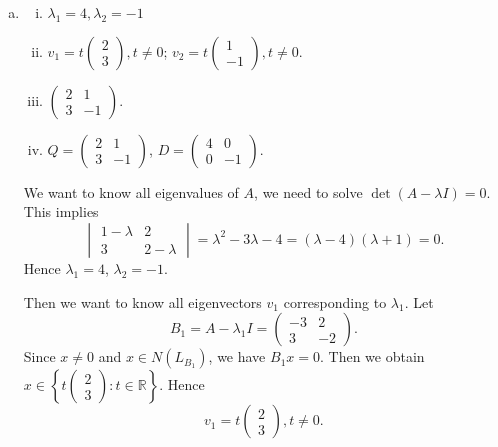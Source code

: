 \begin{Exercise}
\begin{enumerate}[(a)]
\item
\begin{answer}
\begin{enumerate}[(i)]
\item $\lambda_1 = 4, \lambda_2 = -1$

\item $v_1 = t\begin{pmatrix}
2 \\
3
\end{pmatrix}, t\neq 0$; $v_2=t\begin{pmatrix}
1 \\
-1
\end{pmatrix}, t\neq 0$.

\item $\begin{pmatrix}
2 & 1 \\
3 & -1
\end{pmatrix}$.

\item $Q = \begin{pmatrix}
2 & 1 \\
3 & -1
\end{pmatrix}$, $D = \begin{pmatrix}
4 & 0 \\
0 & -1
\end{pmatrix}$.
\end{enumerate}
\end{answer}
\begin{solution}
We want to know all eigenvalues of $A$, we need to solve $\det(A-\lambda I) = 0$. This implies
$$
\begin{vmatrix}
1-\lambda & 2 \\
3 & 2-\lambda
\end{vmatrix} =  \lambda^2 -3\lambda - 4
= (\lambda-4)(\lambda+1)
= 0.
$$
Hence $\lambda_1 = 4$, $\lambda_2 = -1$.

Then we want to know all eigenvectors $v_1$ corresponding to $\lambda_1$. Let
$$
B_1 = A-\lambda_1 I = \begin{pmatrix}
-3 & 2 \\
3 & -2
\end{pmatrix}.
$$
Since $x\neq 0$ and $x\in N(L_{B_1})$, we have $B_1 x = 0$. Then we obtain $x \in \left\{t\begin{pmatrix}
2 \\
3
\end{pmatrix}:t\in\mathbb{R}\right\}$. Hence
$$
v_1 = t\begin{pmatrix}
2 \\
3
\end{pmatrix}, t\neq 0.
$$


\end{solution}
\end{enumerate}
\end{Exercise}
